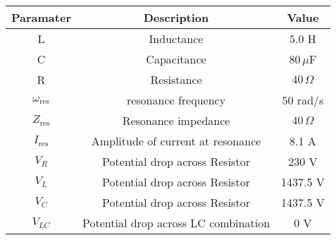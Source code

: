 \begin{tabular}{|c|c|c|}
\hline
\textbf{Paramater} & \textbf{Description} & \textbf{Value}  \\ \hline
L & Inductance & $5.0$ H  \\ \hline
C & Capacitance & $80\,\mu$F \\ \hline
R & Resistance & $40\,\Omega$ \\ \hline
$\omega_{\text{res}}$ & resonance frequency & $50$ rad/s \\ \hline 
$Z_{\text{res}} $& Resonance impedance & $40 \,\Omega$ \\ \hline
$I_{\text{res}}$ & Amplitude of current at resonance & 8.1 A \\ \hline
$V_R$ & Potential drop across Resistor & 230 V \\ \hline
$V_L$ & Potential drop across Resistor & 1437.5 V \\ \hline
$V_C$ & Potential drop across Resistor & 1437.5 V \\ \hline
$V_{LC}$ & Potential drop across LC combination & 0 V \\ \hline
\end{tabular}
